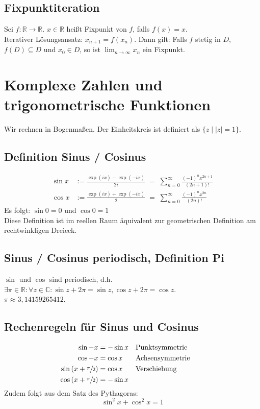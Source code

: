 \documentclass[halfparscip]{scrartcl}
\newcounter{subsection2}
\begin{document}
\subsection*{Fixpunktiteration}
Sei $f : \mathbb{R} \rightarrow \mathbb{R}$. $x \in \mathbb{R}$ heißt Fixpunkt von $f$, falls $f(x) = x$.\\
Iterativer Lösungsansatz: $x_{n+1} = f(x_n)$. Dann gilt: Falls $f$ stetig in $D$, $f(D) \subseteq D$ und $x_0 \in D$, so ist $\lim_{n \rightarrow \infty}x_n$ ein Fixpunkt.

\newpage
\section{Komplexe Zahlen und trigonometrische Funktionen}
Wir rechnen in Bogenmaßen. Der Einheitskreis ist definiert als $\big\{z \;\big\vert\; \vert z\vert = 1\big\}$.

\subsection{Definition Sinus / Cosinus}
\begin{align*}
	\sin x &:= \frac{\exp(ix) - \exp(-ix)}{2i} \;=\; \sum_{n=0}^{\infty}\frac{(-1)^nx^{2n+1}}{(2n+1)!}\\
	\cos x &:= \frac{\exp(ix) + \exp(-ix)}{2} \;=\; \sum_{n=0}^{\infty}\frac{(-1)^nx^{2n}}{(2n)!}
\end{align*}
Es folgt: $\sin 0 = 0$ und $\cos 0 = 1$\\
Diese Definition ist im reellen Raum äquivalent zur geometrischen Definition am rechtwinkligen Dreieck.

\subsection{Sinus / Cosinus periodisch, Definition Pi}
$\sin$ und $\cos$ sind periodisch, d.h. $\exists \pi \in \mathbb{R}: \forall z \in \mathbb{C} : \sin z + 2 \pi = \sin z, \cos z + 2\pi = \cos z$.\\
$\pi \approx 3,14159265412$.

\subsection*{Rechenregeln für Sinus und Cosinus}
\begin{align*}
	\sin -x                              & = -\sin x  &  & \text{Punktsymmetrie}  &  &  &  &  \\
	\cos -x                              & = \cos x   &  & \text{Achsensymmetrie} &  \\
	\sin \left(x + \sfrac{\pi}{2}\right) & = \cos x   &  & \text{Verschiebung}    &  \\
	\cos \left(x + \sfrac{\pi}{2}\right) & = - \sin x &
\end{align*}
Zudem folgt aus dem Satz des Pythagoras:
\begin{equation*}
	\sin^2 x + \cos^2 x = 1
\end{equation*}
\end{document}
